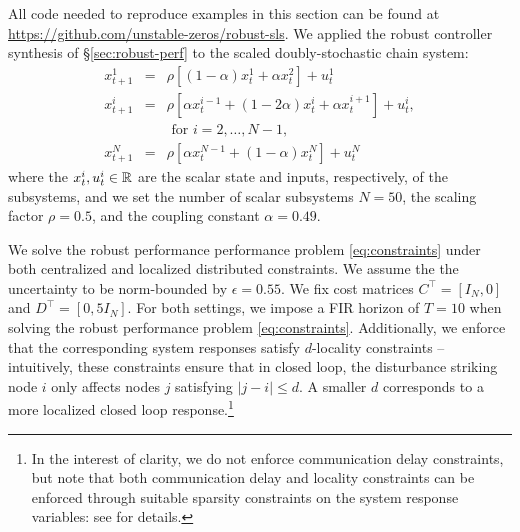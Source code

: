 
All code needed to reproduce examples in this section can be found at \url{https://github.com/unstable-zeros/robust-sls}.  We applied the robust controller synthesis of \S \ref{sec:robust-perf} to the scaled doubly-stochastic chain system:
\begin{equation}\label{eq:chain}
\begin{array}{rcl}
x^1_{t+1} &=& \rho\left[(1-\alpha)x^1_t + \alpha x^2_t\right] + u^1_t\\
x^i_{t+1} &=& \rho\left[\alpha x^{i-1}_t + (1-2\alpha)x^i_t + \alpha x^{i+1}_t\right] + u^i_t,\\
&& \text{ for $i=2,\dots,N-1$,} \\
 x^N_{t+1} &=& \rho\left[\alpha x^{N-1}_t + (1-\alpha)x^N_t\right] + u^N_t
 \end{array}
\end{equation}
where the $x^i_t, u^i_t \in \mathbb{R}$ are the scalar state and inputs, respectively, of the subsystems, and we set the number of scalar subsystems $N=50$, the scaling factor $\rho = 0.5$, and the coupling constant $\alpha = 0.49$.  

We solve the robust performance performance problem \eqref{eq:constraints} under both centralized and localized distributed constraints. We assume the the uncertainty to be norm-bounded by $\epsilon = 0.55$. We fix cost matrices $C^\top = [I_N, 0]$ and $D^\top = [0, 5I_N]$.  For both settings, we impose a FIR horizon of $T=10$ when solving the robust performance problem \eqref{eq:constraints}.  Additionally, we enforce that the corresponding system responses satisfy $d$-locality constraints -- intuitively, these constraints ensure that in closed loop, the disturbance striking node $i$ only affects nodes $j$ satisfying $|j-i|\leq d$. A smaller $d$ corresponds to a more localized closed loop response.\footnote{In the interest of clarity, we do not enforce communication delay constraints, but note that both communication delay and locality constraints can be enforced through suitable sparsity constraints on the system response variables: see \cite{anderson2019system} for details.}


